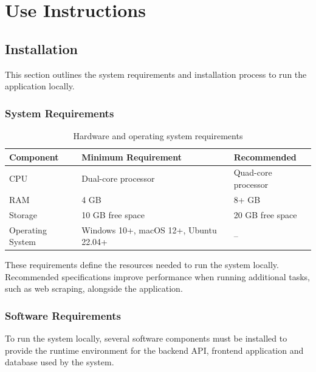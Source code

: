 \section{Use Instructions}

\subsection{Installation}

This section outlines the system requirements and installation process to run the application locally.

\subsubsection{System Requirements}

\begin{table}[h]
\centering
\begin{tabular}{@{} l l l @{}}
\toprule
\textbf{Component} & \textbf{Minimum Requirement} & \textbf{Recommended} \\
\midrule
CPU & Dual-core processor & Quad-core processor \\
RAM & 4 GB & 8+ GB \\
Storage & 10 GB free space & 20 GB free space \\
Operating System & Windows 10+, macOS 12+, Ubuntu 22.04+ & -- \\
\bottomrule
\end{tabular}
\caption{Hardware and operating system requirements}
\end{table}

These requirements define the resources needed to run the system locally. Recommended specifications improve performance when running additional tasks, such as web scraping, alongside the application. 

\subsubsection{Software Requirements}

To run the system locally, several software components must be installed to provide the runtime environment for the backend API, frontend application and database used by the system. 

